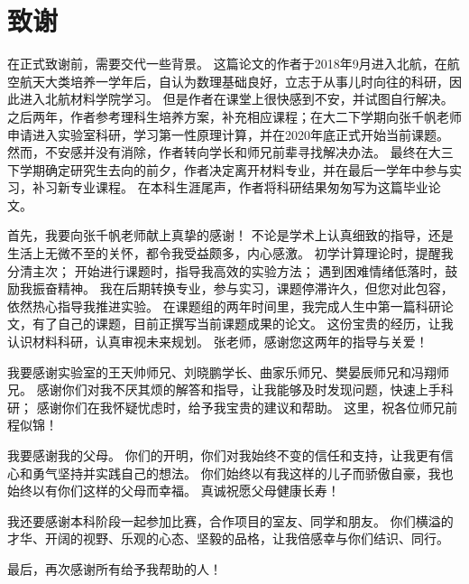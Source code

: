 \chapter*{致谢}

在正式致谢前，需要交代一些背景。
这篇论文的作者于2018年9月进入北航，在航空航天大类培养一学年后，自认为数理基础良好，立志于从事儿时向往的科研，因此进入北航材料学院学习。
但是作者在课堂上很快感到不安，并试图自行解决。
之后两年，作者参考理科生培养方案，补充相应课程；在大二下学期向张千帆老师申请进入实验室科研，学习第一性原理计算，并在2020年底正式开始当前课题。
然而，不安感并没有消除，作者转向学长和师兄前辈寻找解决办法。
最终在大三下学期确定研究生去向的前夕，作者决定离开材料专业，并在最后一学年中参与实习，补习新专业课程。
在本科生涯尾声，作者将科研结果匆匆写为这篇毕业论文。

首先，我要向张千帆老师献上真挚的感谢！
不论是学术上认真细致的指导，还是生活上无微不至的关怀，都令我受益颇多，内心感激。
初学计算理论时，提醒我分清主次；
开始进行课题时，指导我高效的实验方法；
遇到困难情绪低落时，鼓励我振奋精神。
我在后期转换专业，参与实习，课题停滞许久，但您对此包容，依然热心指导我推进实验。
在课题组的两年时间里，我完成人生中第一篇科研论文，有了自己的课题，目前正撰写当前课题成果的论文。
这份宝贵的经历，让我认识材料科研，认真审视未来规划。
张老师，感谢您这两年的指导与关爱！

我要感谢实验室的王天帅师兄、刘晓鹏学长、曲家乐师兄、樊晏辰师兄和冯翔师兄。
感谢你们对我不厌其烦的解答和指导，让我能够及时发现问题，快速上手科研；
感谢你们在我怀疑忧虑时，给予我宝贵的建议和帮助。
这里，祝各位师兄前程似锦！

我要感谢我的父母。
你们的开明，你们对我始终不变的信任和支持，让我更有信心和勇气坚持并实践自己的想法。
你们始终以有我这样的儿子而骄傲自豪，我也始终以有你们这样的父母而幸福。
真诚祝愿父母健康长寿！

我还要感谢本科阶段一起参加比赛，合作项目的室友、同学和朋友。
你们横溢的才华、开阔的视野、乐观的心态、坚毅的品格，让我倍感幸与你们结识、同行。

最后，再次感谢所有给予我帮助的人！

\cleardoublepage
